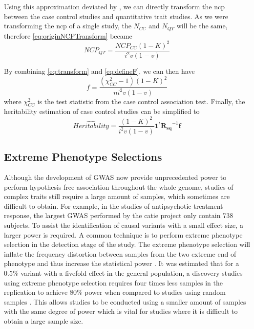 			Using this approximation deviated by \citet{Yang2010}, we can directly transform the \gls{ncp} between the case control studies and quantitative trait studies.
			As we were transforming the \gls{ncp} of a single study, the $N_{CC}$ and $N_{QT}$ will be the same, therefore \cref{eq:originNCPTransform} became
			\begin{equation}
			NCP_{QT} = \frac{NCP_{CC}(1-K)^2}{i^2v(1-v)}
			\label{eq:transform}
			\end{equation}
			
			By combining \cref{eq:transform} and \cref{eq:defineF}, we can then have
			\begin{equation}
			f = \frac{(\chi^2_{CC}-1)(1-K)^2}{ni^2v(1-v)}
			\end{equation}
			where $\chi^2_{CC}$ is the test statistic from the case control association test.
			Finally, the heritability estimation of case control studies can be simplified to 
			\begin{equation}
			\hat{Heritability} =\frac{(1-K)^2}{i^2v(1-v)} \boldsymbol{1}^t\boldsymbol{R_{sq}}^{-1}\boldsymbol{f}
			\label{eq:caseControlHerit}
			\end{equation}
			
		\subsection{Extreme Phenotype Selections}
			Although the development of \gls{GWAS} now provide unprecedented power to perform hypothesis free association throughout the whole genome, studies of complex traits still require a large amount of samples, which sometimes are difficult to obtain.
			For example, in the studies of antipsychotic treatment response, the largest \gls{GWAS} performed by the \gls{catie} project only contain 738 subjects. 
			To assist the identification of causal variants with a small effect size, a larger power is required. 
			A common technique is to perform extreme phenotype selection in the detection stage of the study.
			The extreme phenotype selection will inflate the frequency distortion between samples from the two extreme end of phenotype and thus increase the statistical power \citep{Guey2011}.
			It was estimated that for a 0.5\% variant with a fivefold effect in the general population, a discovery studies using extreme phenotype selection requires four times less samples in the replication to achieve 80\% power when compared to studies using random samples \citep{Guey2011}.
			This allows studies to be conducted using a smaller amount of samples with the same degree of power which is vital for studies where it is difficult to obtain a large sample size.
			
